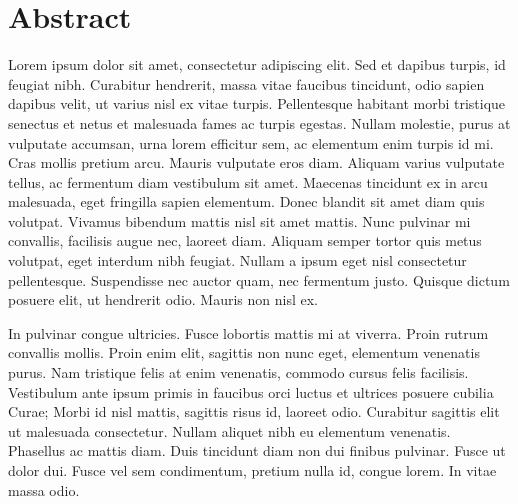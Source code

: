 
\chapter*{Abstract}


Lorem ipsum dolor sit amet, consectetur adipiscing elit. Sed et dapibus turpis,
id feugiat nibh. Curabitur hendrerit, massa vitae faucibus tincidunt, odio
sapien dapibus velit, ut varius nisl ex vitae turpis. Pellentesque habitant
morbi tristique senectus et netus et malesuada fames ac turpis egestas. Nullam
molestie, purus at vulputate accumsan, urna lorem efficitur sem, ac elementum
enim turpis id mi. Cras mollis pretium arcu. Mauris vulputate eros diam. Aliquam
varius vulputate tellus, ac fermentum diam vestibulum sit amet. Maecenas
tincidunt ex in arcu malesuada, eget fringilla sapien elementum. Donec blandit
sit amet diam quis volutpat. Vivamus bibendum mattis nisl sit amet mattis. Nunc
pulvinar mi convallis, facilisis augue nec, laoreet diam. Aliquam semper tortor
quis metus volutpat, eget interdum nibh feugiat. Nullam a ipsum eget nisl
consectetur pellentesque. Suspendisse nec auctor quam, nec fermentum justo.
Quisque dictum posuere elit, ut hendrerit odio. Mauris non nisl ex.

In pulvinar congue ultricies. Fusce lobortis mattis mi at viverra. Proin rutrum
convallis mollis. Proin enim elit, sagittis non nunc eget, elementum venenatis
purus. Nam tristique felis at enim venenatis, commodo cursus felis facilisis.
Vestibulum ante ipsum primis in faucibus orci luctus et ultrices posuere cubilia
Curae; Morbi id nisl mattis, sagittis risus id, laoreet odio. Curabitur sagittis
elit ut malesuada consectetur. Nullam aliquet nibh eu elementum venenatis.
Phasellus ac mattis diam. Duis tincidunt diam non dui finibus pulvinar. Fusce ut
dolor dui. Fusce vel sem condimentum, pretium nulla id, congue lorem. In vitae
massa odio.